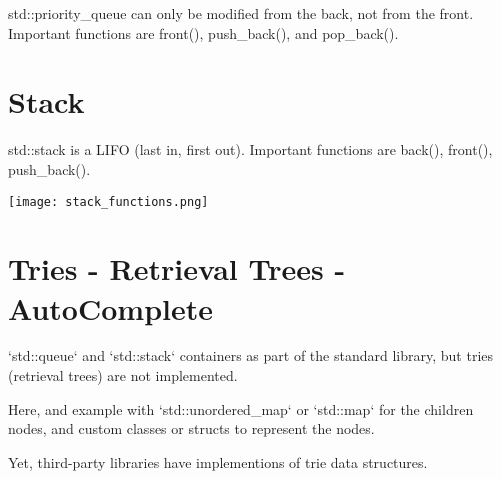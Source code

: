 std::priority\_queue can only be modified from the back, not from the front. Important functions are front(), push\_back(), 
and pop\_back().

\section{Stack}

std::stack is a LIFO (last in, first out). Important functions are back(), front(), push\_back().

\begin{center}
    \texttt{[image: stack\_functions.png]}
\end{center}

\section{Tries - Retrieval Trees - AutoComplete}

`std::queue` and `std::stack` containers as part of the standard library, but tries (retrieval trees) are not implemented. 

Here, and example with `std::unordered\_map` or `std::map` for the children nodes,
and custom classes or structs to represent the nodes.

Yet, third-party libraries have implementions of trie data structures.

